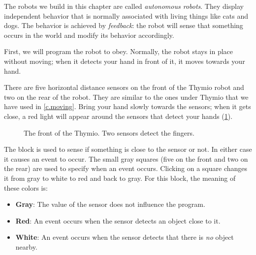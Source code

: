 
\label{ch.pet}

The robots we build in this chapter are called \emph{autonomous robots}.
They display independent behavior that is normally associated with
living things like cats and dogs. The behavior is achieved by
\textit{feedback}: the robot will sense that something occurs in the
world and modify its behavior accordingly.


First, we will program the robot to obey. Normally, the robot stays in
place without moving; when it detects your hand in front of it, it
moves towards your hand.

There are five horizontal distance sensors on the front of the Thymio
robot and two on the rear of the robot.
They are similar to the ones under Thymio that we have used in \cref{c.moving}.
Bring your hand slowly towards the
sensors; when it gets close, a red light will appear around the sensors
that detect your hands (\cref{fig.detect}).

\begin{figure}
\begin{center}
\caption{The front of the Thymio. Two sensors detect the fingers.}\label{fig.detect}
\end{center}
\end{figure}

The block  is used to sense if something is close to the
sensor or not. In either case it causes an event to occur. The small
gray squares (five on the front and two on the rear) are used to specify
when an event occurs. Clicking on a square changes it from gray to
white to red and back to gray.
For this block, the meaning of these colors is:

\begin{itemize}
\item \textbf{Gray}: The value of the sensor does not influence the
program.
\item \textbf{Red}: An event occurs when the sensor detects an object
close to it.
\item \textbf{White}: An event occurs when the sensor detects that there
is \emph{no} object nearby.
\end{itemize}

